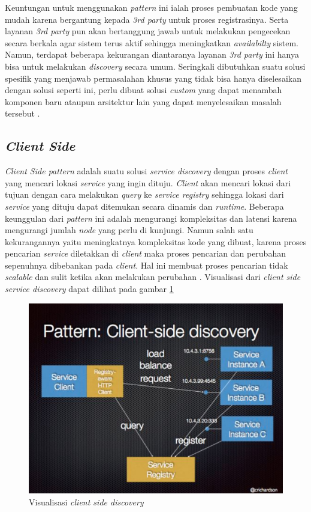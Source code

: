 Keuntungan untuk menggunakan \textit{pattern} ini ialah proses pembuatan kode yang mudah karena bergantung kepada \textit{3rd party} untuk proses registrasinya. Serta layanan \textit{3rd party} pun akan bertanggung jawab untuk melakukan pengecekan secara berkala agar sistem terus aktif sehingga meningkatkan \textit{availabilty} sistem. Namun, terdapat beberapa kekurangan diantaranya layanan \textit{3rd party} ini hanya bisa untuk melakukan \textit{discovery} secara umum. Seringkali dibutuhkan suatu solusi spesifik yang menjawab permasalahan khusus yang tidak bisa hanya diselesaikan dengan solusi seperti ini, perlu dibuat solusi \textit{custom} yang dapat menambah komponen baru ataupun arsitektur lain yang dapat menyelesaikan masalah tersebut \parencite{3rdpartyintegration}.

\subsection{\textit{Client Side}}
\textit{Client Side pattern} adalah suatu solusi \textit{service discovery} dengan proses \textit{client} yang mencari lokasi \textit{service} yang ingin dituju. \textit{Client} akan mencari lokasi dari tujuan dengan cara melakukan \textit{query} ke \textit{service registry} sehingga lokasi dari \textit{service} yang dituju dapat ditemukan secara dinamis dan \textit{runtime}. Beberapa keunggulan dari \textit{pattern} ini adalah mengurangi kompleksitas dan latensi karena mengurangi jumlah \textit{node} yang perlu di kunjungi. Namun salah satu kekurangannya yaitu meningkatnya kompleksitas kode yang dibuat, karena proses pencarian \textit{service} diletakkan di \textit{client} maka proses pencarian dan perubahan sepenuhnya dibebankan pada \textit{client}. Hal ini membuat proses pencarian tidak \textit{scalable} dan sulit ketika akan melakukan perubahan \parencite{clientsidediscovery}. Visualisasi dari \textit{client side service discovery} dapat dilihat pada gambar \ref{fig:client-side-discovery}

\begin{figure}[h]
  \centering
  \includegraphics[width=1\textwidth]{resources/chapter-2/client-side-discovery.jpg}
  \caption{Visualisasi \textit{client side discovery} \parencite{clientsidediscovery} }
  \label{fig:client-side-discovery}
\end{figure}

